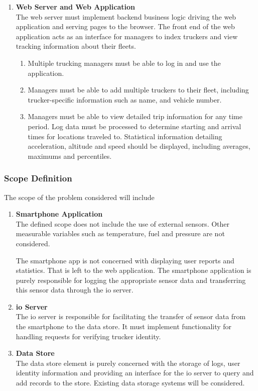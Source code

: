 \begin{enumerate}
\item \textbf{Web Server and Web Application}\\
The web server must implement backend business logic driving the web application and serving pages to the browser.
The front end of the web application acts as an interface for managers to index truckers and view tracking information about their fleets.
    \begin{enumerate}
        \item Multiple trucking managers must be able to log in and use the application.
        \item Managers must be able to add multiple truckers to their fleet, including trucker-specific information such as name, and vehicle number.
        \item Managers must be able to view detailed trip information for any time period. Log data must be processed to determine starting and arrival times for locations traveled to. Statistical information detailing acceleration, altitude and speed should be displayed, including averages, maximums and percentiles.
    \end{enumerate}
\end{enumerate}
\subsubsection{Scope Definition}
The scope of the problem considered will include
\begin{enumerate}
\item \textbf{Smartphone Application}\\
The defined scope does not include the use of external sensors.
Other measurable variables such as temperature, fuel and pressure are not considered.

The smartphone app is not concerned with displaying user reports and statistics. That is left to the web application.
The smartphone application is purely responsible for logging the appropriate sensor data and transferring this sensor data through the \ac{io} server.
\item \textbf{\ac{io} Server}\\
The \ac{io} server is responsible for facilitating the transfer of sensor data from the smartphone to the data store.
It must implement functionality for handling requests for verifying trucker identity. 
\item \textbf{Data Store}\\
The data store element is purely concerned with the storage of logs, user identity information and providing an interface for the \ac{io} server to query and add records to the store.
Existing data storage systems will be considered.
\end{enumerate}

